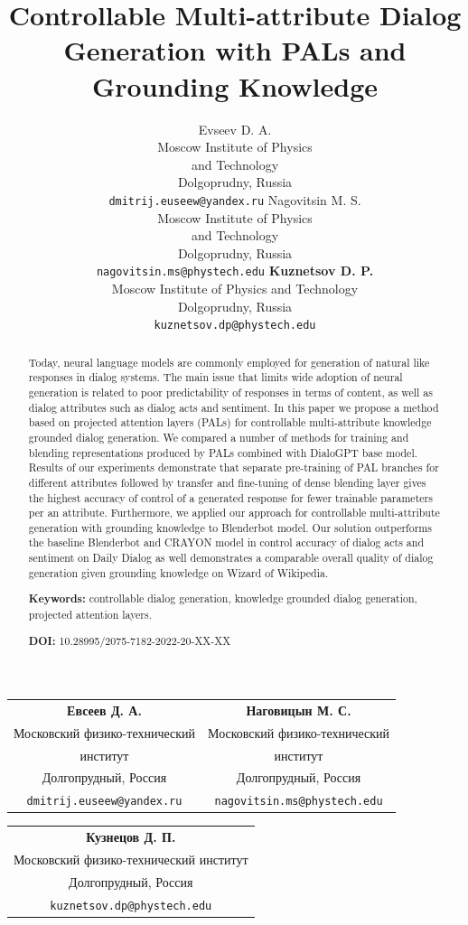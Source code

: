 \documentclass[11pt]{article}
\title{Controllable Multi-attribute Dialog Generation with PALs and Grounding Knowledge}
\author{Evseev D. A. \\
  Moscow Institute of Physics \\
  and Technology \\
  Dolgoprudny, Russia \\
  {\tt dmitrij.euseew@yandex.ru} \And
  Nagovitsin M. S. \\
  Moscow Institute of Physics \\
  and Technology \\
  Dolgoprudny, Russia \\
  {\tt nagovitsin.ms@phystech.edu}
  \AND
  {\bf Kuznetsov D. P.} \\
  Moscow Institute of Physics and Technology \\
  Dolgoprudny, Russia \\
  {\tt kuznetsov.dp@phystech.edu} \\
  }
\date{}
\begin{document}
\maketitle
\begin{abstract}
Today, neural language models are commonly employed for generation of natural like responses in dialog systems. The main issue that limits wide adoption of neural generation is related to poor predictability of responses in terms of content, as well as dialog attributes such as dialog acts and sentiment.
In this paper we propose a method based on projected attention layers (PALs) for controllable multi-attribute knowledge grounded dialog generation. We compared a number of methods for training and blending representations produced by PALs combined with DialoGPT base model. Results of our experiments demonstrate that separate pre-training of PAL branches for different attributes followed by transfer and fine-tuning of dense blending layer gives the highest accuracy of control of a generated response for fewer trainable parameters per an attribute. Furthermore, we applied our approach for controllable multi-attribute generation with grounding knowledge to Blenderbot model. Our solution outperforms the baseline Blenderbot and CRAYON model in control accuracy of dialog acts and sentiment on Daily Dialog as well demonstrates a comparable overall quality  of dialog generation given grounding knowledge on Wizard of Wikipedia.
  
\textbf{Keywords:} controllable dialog generation, knowledge grounded dialog generation, projected attention layers.

\textbf{DOI:} 10.28995/2075-7182-2022-20-XX-XX
\end{abstract}

\begin{center}

  \medskip \setlength\tabcolsep{1cm}
  \begin{tabular}{cc}
    \textbf{Евсеев Д. А.} & \textbf{Наговицын М. С.}\\
      Московский физико-технический & Московский физико-технический\\
      институт & институт \\
      Долгопрудный, Россия & Долгопрудный, Россия\\
      {\tt dmitrij.euseew@yandex.ru} & {\tt nagovitsin.ms@phystech.edu}
  \end{tabular}
  \begin{tabular}{c}
    \textbf{Кузнецов Д. П.}\\
      Московский физико-технический институт\\
      Долгопрудный, Россия\\
      {\tt kuznetsov.dp@phystech.edu}
  \end{tabular}
  \medskip
\end{center}
\end{document}
